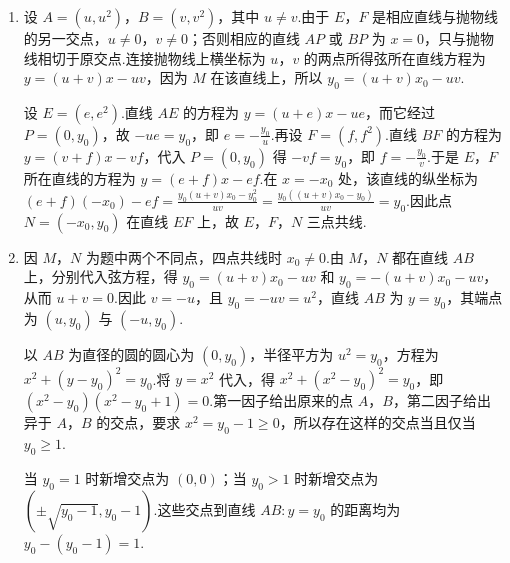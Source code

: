\begin{solution}
\begin{enumerate}
\item 设 \(A=(u,u^2)\)，\(B=(v,v^2)\)，其中 \(u\ne v\).由于 \(E\)，\(F\) 是相应直线与抛物线的另一交点，\(u\ne0\)，\(v\ne0\)；否则相应的直线 \(AP\) 或 \(BP\) 为 \(x=0\)，只与抛物线相切于原交点.连接抛物线上横坐标为 \(u\)，\(v\) 的两点所得弦所在直线方程为 \(y=(u+v)x-uv\)，因为 \(M\) 在该直线上，所以 \(y_0=(u+v)x_0-uv\).

设 \(E=(e,e^2)\).直线 \(AE\) 的方程为 \(y=(u+e)x-ue\)，而它经过 \(P=(0,y_0)\)，故 \(-ue=y_0\)，即 \(e=-\frac{y_0}{u}\).再设 \(F=(f,f^2)\).直线 \(BF\) 的方程为 \(y=(v+f)x-vf\)，代入 \(P=(0,y_0)\) 得 \(-vf=y_0\)，即 \(f=-\frac{y_0}{v}\).于是 \(E\)，\(F\) 所在直线的方程为 \(y=(e+f)x-ef\).在 \(x=-x_0\) 处，该直线的纵坐标为 \(\displaystyle(e+f)(-x_0)-ef=\frac{y_0(u+v)x_0-y_0^2}{uv}=\frac{y_0((u+v)x_0-y_0)}{uv}=y_0\).因此点 \(N=(-x_0,y_0)\) 在直线 \(EF\) 上，故 \(E\)，\(F\)，\(N\) 三点共线.

\item 因 \(M\)，\(N\) 为题中两个不同点，四点共线时 \(x_0\ne0\).由 \(M\)，\(N\) 都在直线 \(AB\) 上，分别代入弦方程，得 \(y_0=(u+v)x_0-uv\) 和 \(y_0=-(u+v)x_0-uv\)，从而 \(u+v=0\).因此 \(v=-u\)，且 \(y_0=-uv=u^2\)，直线 \(AB\) 为 \(y=y_0\)，其端点为 \((u,y_0)\) 与 \((-u,y_0)\).

以 \(AB\) 为直径的圆的圆心为 \((0,y_0)\)，半径平方为 \(u^2=y_0\)，方程为 \(x^2+(y-y_0)^2=y_0\).将 \(y=x^2\) 代入，得 \(x^2+(x^2-y_0)^2=y_0\)，即 \((x^2-y_0)(x^2-y_0+1)=0\).第一因子给出原来的点 \(A\)，\(B\)，第二因子给出异于 \(A\)，\(B\) 的交点，要求 \(x^2=y_0-1\geqslant0\)，所以存在这样的交点当且仅当 \(y_0\geqslant1\).

当 \(y_0=1\) 时新增交点为 \((0,0)\)；当 \(y_0>1\) 时新增交点为 \((\pm\sqrt{y_0-1},y_0-1)\).这些交点到直线 \(AB:y=y_0\) 的距离均为 \(y_0-(y_0-1)=1\).
\end{enumerate}
\end{solution}
